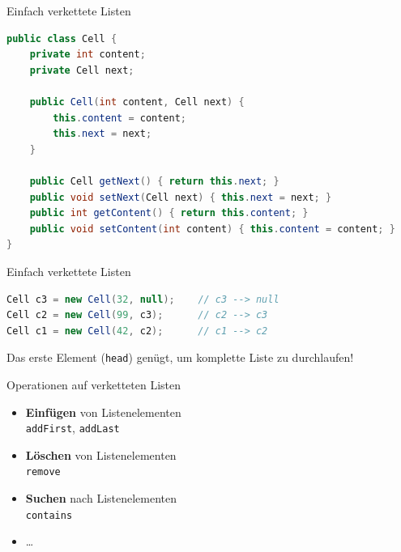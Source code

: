 \documentclass[18pt]{beamer}
\begin{document}
\begin{frame}[fragile]{Einfach verkettete Listen}

    \begin{exampleblock}{}
        \begin{lstlisting}[language=Java,basicstyle=\scriptsize]
public class Cell {
    private int content;
    private Cell next;

    public Cell(int content, Cell next) {
        this.content = content;
        this.next = next;
    }

    public Cell getNext() { return this.next; }
    public void setNext(Cell next) { this.next = next; }
    public int getContent() { return this.content; }
    public void setContent(int content) { this.content = content; }
}
        \end{lstlisting}
    \end{exampleblock}

\end{frame}


\begin{frame}[fragile]{Einfach verkettete Listen}

    \begin{exampleblock}{}
        \begin{lstlisting}[language=Java,basicstyle=\scriptsize]
Cell c3 = new Cell(32, null);    // c3 --> null
Cell c2 = new Cell(99, c3);      // c2 --> c3
Cell c1 = new Cell(42, c2);      // c1 --> c2
        \end{lstlisting}
    \end{exampleblock}

\vspace{.2in}

\pause

Das erste Element (\texttt{head}) genügt, um komplette Liste zu durchlaufen!

\end{frame}


\begin{frame}{Operationen auf verketteten Listen}
    \begin{itemize}
        \item \textbf{Einfügen} von Listenelementen\\
        \texttt{addFirst}, \texttt{addLast}
        \item \textbf{Löschen} von Listenelementen\\
        \texttt{remove}
        \item \textbf{Suchen} nach Listenelementen\\
        \texttt{contains}
        \item \dots
    \end{itemize}
\end{frame}
\end{document}
